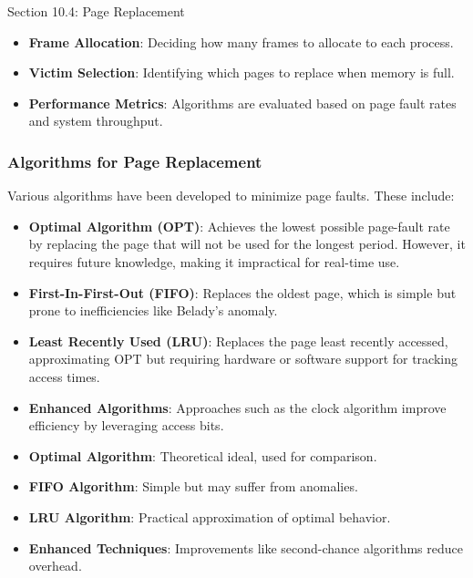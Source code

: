 \begin{notes}{Section 10.4: Page Replacement}
    \begin{highlight}
        \begin{itemize}
            \item \textbf{Frame Allocation}: Deciding how many frames to allocate to each process.
            \item \textbf{Victim Selection}: Identifying which pages to replace when memory is full.
            \item \textbf{Performance Metrics}: Algorithms are evaluated based on page fault rates and system throughput.
        \end{itemize}
    \end{highlight}
    
    \subsubsection*{Algorithms for Page Replacement}
    
    Various algorithms have been developed to minimize page faults. These include:
    \begin{itemize}
        \item \textbf{Optimal Algorithm (OPT)}: Achieves the lowest possible page-fault rate by replacing the page that will not be used for the longest period. However, it requires future knowledge, 
        making it impractical for real-time use.
        \item \textbf{First-In-First-Out (FIFO)}: Replaces the oldest page, which is simple but prone to inefficiencies like Belady's anomaly.
        \item \textbf{Least Recently Used (LRU)}: Replaces the page least recently accessed, approximating OPT but requiring hardware or software support for tracking access times.
        \item \textbf{Enhanced Algorithms}: Approaches such as the clock algorithm improve efficiency by leveraging access bits.
    \end{itemize}
    
    \begin{highlight}
        \begin{itemize}
            \item \textbf{Optimal Algorithm}: Theoretical ideal, used for comparison.
            \item \textbf{FIFO Algorithm}: Simple but may suffer from anomalies.
            \item \textbf{LRU Algorithm}: Practical approximation of optimal behavior.
            \item \textbf{Enhanced Techniques}: Improvements like second-chance algorithms reduce overhead.
        \end{itemize}
    \end{highlight}
    

\end{notes}
